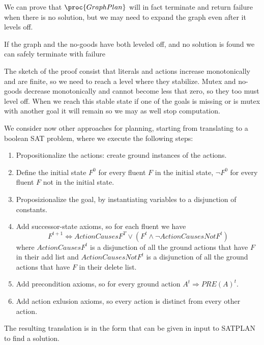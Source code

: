 We can prove that $\proc{GraphPlan}$ will in fact terminate and return failure when there is no
solution, but we may need to expand the graph even after it levels off.\newline
\begin{thm}
    If the graph and the no-goods have both leveled off, and no solution is found we can 
    safely terminate with failure
\end{thm}
The sketch of the proof consist that literals and actions increase monotonically and are finite,
so we need to reach a level where they stabilize.\newline
Mutex and no-goods decrease monotonically and cannot become less that zero, so they too
must level off.\newline
When we reach this stable state if one of the goals is missing or is mutex with another goal
it will remain so we may as well stop computation.

We consider now other approaches for planning, starting from translating to a boolean SAT problem,
where we execute the following steps:
\begin{enumerate}
    \item Propositionalize the actions: create ground instances of the actions.
    \item Define the initial state $F^0$ for every fluent $F$ in the initial state, $\neg F^0$
	  for every fluent $F$ not in the initial state.
    \item Proposizionalize the goal, by instantiating variables to a disjunction of constants.
    \item Add successor-state axioms, so for each fluent we have 
	  \[ F^{t+1} \iff ActionCausesF^T \lor (F^t \land \neg ActionCausesNotF^t) \]
	  where $ActionCausesF^t$ is a disjunction of all the ground actions that have $F$ in 
	  their add list and $ActionCausesNotF^t$ is a disjunction of all the ground actions
	  that have $F$ in their delete list.
    \item Add precondition axioms, so for every ground action $A^t \Rightarrow PRE(A)^t$.
    \item Add action exlusion axioms, so every action is distinct from every other action.
\end{enumerate}
The resulting translation is in the form that can be given in input to SATPLAN to find a solution.

